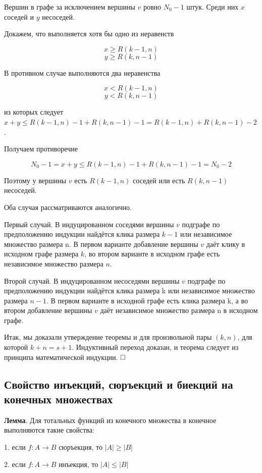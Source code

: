 \documentclass[a4paper, 10pt]{article}
\begin{document}
Вершин в графе за исключением вершины $v$ ровно $N_0 - 1$ штук. Среди них $x$ соседей и $y$ несоседей.

Докажем, что выполняется хотя бы одно из неравенств

$$x \geqslant R(k - 1, n)$$
$$y \geqslant R(k, n - 1)$$

В противном случае выполняются два неравенства

$$x < R(k - 1, n)$$
$$y < R(k, n - 1)$$

из которых следует $x+y \leqslant R(k - 1, n) - 1+R(k, n - 1) - 1 = R(k - 1, n)+R(k, n - 1) - 2$.

Получаем противоречие

$$N_0 - 1 = x + y \leqslant R(k - 1, n) - 1 + R(k, n - 1) - 1 = N_0 - 2$$

Поэтому у вершины $v$ есть $R(k - 1, n)$ соседей или есть $R(k, n - 1)$ несоседей.

Оба случая рассматриваются аналогично.

Первый случай. В индуцированном соседями вершины $v$ подграфе по предположению индукции найдётся клика размера $k - 1$ или независимое множество размера n. В первом варианте добавление вершины $v$ даёт клику в исходном графе размера $k$, во втором варианте в исходном графе есть независимое множество размера $n$.

Второй случай. В индуцированном несоседями вершины $v$ подграфе по предположению индукции найдётся клика размера k или независимое множество размера $n - 1$. В первом варианте в исходной графе есть клика размера k, а во втором добавление вершины $v$ даёт независимое множество размера n в исходном графе.

Итак, мы доказали утверждение теоремы и для произвольной пары $(k, n)$, для которой $k + n = s + 1$. Индуктивный переход доказан, и теорема следует из принципа математической индукции. $\hfill \square$



\subsection{Свойство инъекций, сюръекций и биекций на конечных множествах}

\textbf{Лемма}. Для тотальных функций из конечного множества в конечное выполняются такие свойства:

1. если $f: A \to B$ сюръекция, то $|A| \geqslant |B|$

2. если $f: A \to B$ инъекция, то $|A| \leqslant |B|$
\end{document}
